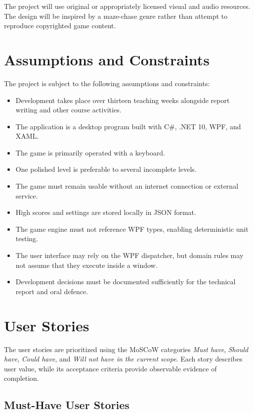 The project will use original or appropriately licensed visual and audio resources. The design will be inspired by a maze-chase genre rather than attempt to reproduce copyrighted game content.

\section{Assumptions and Constraints}

The project is subject to the following assumptions and constraints:

\begin{itemize}
	\item Development takes place over thirteen teaching weeks alongside report writing and other course activities.
	\item The application is a desktop program built with C\#, .NET 10, WPF, and XAML.
	\item The game is primarily operated with a keyboard.
	\item One polished level is preferable to several incomplete levels.
	\item The game must remain usable without an internet connection or external service.
	\item High scores and settings are stored locally in JSON format.
	\item The game engine must not reference WPF types, enabling deterministic unit testing.
	\item The user interface may rely on the WPF dispatcher, but domain rules may not assume that they execute inside a window.
	\item Development decisions must be documented sufficiently for the technical report and oral defence.
\end{itemize}

\section{User Stories}

The user stories are prioritized using the MoSCoW categories \emph{Must have}, \emph{Should have}, \emph{Could have}, and \emph{Will not have in the current scope}. Each story describes user value, while its acceptance criteria provide observable evidence of completion.

\subsection{Must-Have User Stories}

